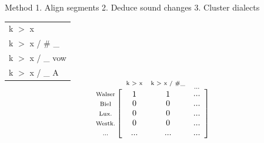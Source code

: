 \documentclass[xcolor={dvipsnames}]{beamer}
\newcommand{\indsize}{\scriptsize}
\newcommand{\colind}[2]{\displaystyle\smash{\mathop{#1}^{\raisebox{.5\normalbaselineskip}{\indsize #2}}}}
\newcommand{\rowind}[1]{\mbox{\indsize #1}}
\begin{document}
\begin{frame}[t]{Method}{}
{ { 1.} Align segments} \hspace{0.5em} { 2.} Deduce sound changes \hspace{0.5em} { { 3.} Cluster dialects}

\vspace{2em}


\vspace{1em}
\begin{minipage}{0.3\textwidth}
\begin{tabular}{l}
k $>$ x\\
k $>$ x / \# \_\\
k $>$ x / \_ vow\\
k $>$ x / \_ A
\end{tabular}
\end{minipage}%
\begin{minipage}{0.7\textwidth}

\[
  \begin{array}{@{}c@{}}
    \rowind{Walser} \\ \rowind{Biel} \\ \rowind{Lux.} \\ \rowind{Westk.} \\ \rowind{...}
  \end{array}
  \mathop{\left[
  \begin{array}{ *{3}{c} }
     \colind{1}{k $>$ x}  &  \colind{1}{k $>$ x / \#\_}  &  \colind{...}{...} \\
    0 &  0  &  ... \\
     0  & 0 &  ... \\
     0  &  0  & ... \\
     ...  &  ...  &  ...
  \end{array}
  \right]}
\]
\end{minipage}
\end{frame}
\end{document}
